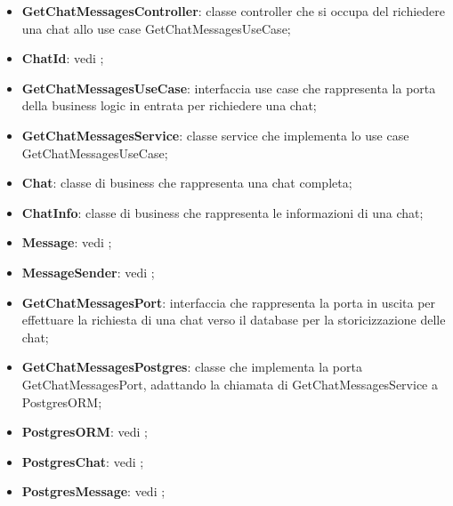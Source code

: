 \documentclass[10pt, a4paper]{article}
\begin{document}
\begin{itemize}
    \item \label{GetChatMessagesController}\textbf{GetChatMessagesController}: classe controller che si occupa del richiedere una chat allo use case GetChatMessagesUseCase;
    \item \textbf{ChatId}: vedi ;
    \item \label{GetChatMessagesUseCase}\textbf{GetChatMessagesUseCase}: interfaccia use case che rappresenta la porta della business logic in entrata per richiedere una chat;
    \item \label{GetChatMessagesService}\textbf{GetChatMessagesService}: classe service che implementa lo use case GetChatMessagesUseCase;
    \item \label{Chat}\textbf{Chat}: classe di business che rappresenta una chat completa;
    \item \label{ChatInfo}\textbf{ChatInfo}: classe di business che rappresenta le informazioni di una chat;
    \item \textbf{Message}: vedi ;
    \item \textbf{MessageSender}: vedi ;
    \item \label{GetChatMessagesPort}\textbf{GetChatMessagesPort}: interfaccia che rappresenta la porta in uscita per effettuare la richiesta di una chat verso il database per la storicizzazione delle chat;
    \item \label{GetChatMessagesPostgres}\textbf{GetChatMessagesPostgres}: classe che implementa la porta GetChatMessagesPort, adattando la chiamata di GetChatMessagesService a PostgresORM;
    \item \textbf{PostgresORM}: vedi ;
    \item \textbf{PostgresChat}: vedi ;
    \item \textbf{PostgresMessage}: vedi ;
\end{itemize}
\end{document}
